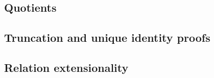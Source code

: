 \subsection{Quotients}\label{sec:equiv-relat-quot}


\subsection{Truncation and unique identity proofs}\label{sec:trunc-sets-prop}


\subsection{Relation extensionality}\label{sec:relation-extensionality}

